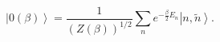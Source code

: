 \begin{equation}
\left| 0\left( \beta \right) \right\rangle =\frac{1}{\left( Z\left( \beta
\right) \right) ^{1/2}}\sum_{n}e^{-\frac{\beta }{2}E_{n}}\left| n,\tilde{n}
\right\rangle. 
\end{equation}

